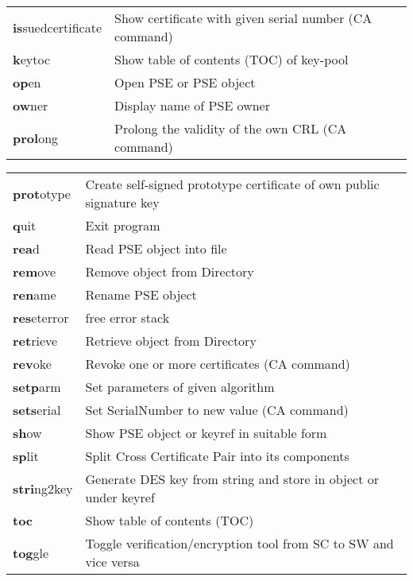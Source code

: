 \begin{tabular}{ll}
{\bf is}suedcertificate & Show certificate with given serial number (CA command)        \\
{\bf k}eytoc       & Show table of contents (TOC) of key-pool                          \\
{\bf op}en         & Open PSE or PSE object                                            \\
{\bf ow}ner        & Display name of PSE owner                                         \\
{\bf prol}ong      & Prolong the validity of the own CRL (CA command)                \\ 
\end{tabular}
\begin{tabular}{ll}
{\bf prot}otype    & Create self-signed prototype certificate of own public signature key \\
{\bf q}uit         & Exit program                                                      \\
{\bf rea}d         & Read PSE object into file                                         \\
{\bf rem}ove       & Remove object from Directory				       \\
{\bf ren}ame       & Rename PSE object                                                 \\
{\bf res}eterror   & free error stack                                                  \\
{\bf ret}rieve     & Retrieve object from Directory				       \\
{\bf rev}oke       & Revoke one or more certificates (CA command)                      \\
{\bf setp}arm      & Set parameters of given algorithm                                 \\
{\bf sets}erial    & Set SerialNumber to new value (CA command)                        \\
{\bf sh}ow         & Show PSE object or keyref in suitable form                        \\
{\bf sp}lit        & Split Cross Certificate Pair into its components                  \\
{\bf stri}ng2key   & Generate DES key from string and store in object or under keyref  \\
{\bf toc}          & Show table of contents (TOC)                                      \\
{\bf tog}gle       & Toggle verification/encryption tool from SC to SW and vice versa  \\

\end{tabular}

